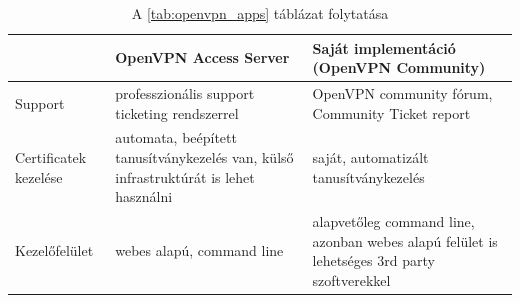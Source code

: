 \pagebreak

\begin{table}[h]
\caption{A \ref{tab:openvpn_apps} táblázat folytatása}
\label{tab:openvpn_apps2}
\begin{tabularx}{\textwidth}{l|L|L}
 & OpenVPN Access Server \cite{openvpnaccessserver} & Saját implementáció (OpenVPN Community) \\
\hline
Support & professzionális support ticketing rendszerrel & OpenVPN community fórum, Community Ticket report \\
\hline
Certificatek kezelése & automata, beépített tanusítványkezelés van, külső infrastruktúrát is lehet használni & saját, automatizált tanusítványkezelés \\
\hline
Kezelőfelület & webes alapú, command line & alapvetőleg command line, azonban webes alapú felület is lehetséges 3rd party szoftverekkel
\end{tabularx}
\end{table}
